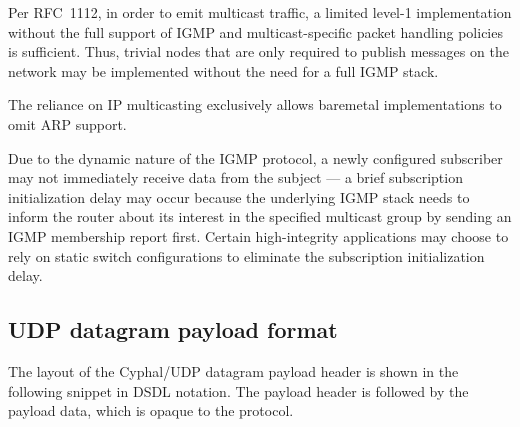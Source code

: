 \begin{remark}
    Per RFC~1112, in order to emit multicast traffic,
    a limited level-1 implementation without the full support of IGMP and multicast-specific packet handling policies
    is sufficient.
    Thus, trivial nodes that are only required to publish messages on the network may be implemented
    without the need for a full IGMP stack.

    The reliance on IP multicasting exclusively allows baremetal implementations to omit ARP support.
\end{remark}

\begin{remark}
    Due to the dynamic nature of the IGMP protocol,
    a newly configured subscriber may not immediately receive data from the subject ---
    a brief subscription initialization delay may occur
    because the underlying IGMP stack needs to inform the router about its interest
    in the specified multicast group by sending an IGMP membership report first.
    Certain high-integrity applications may choose to rely on static switch configurations
    to eliminate the subscription initialization delay.
\end{remark}

\subsection{UDP datagram payload format}

The layout of the Cyphal/UDP datagram payload header is shown in the following snippet in DSDL notation.
The payload header is followed by the payload data, which is opaque to the protocol.

